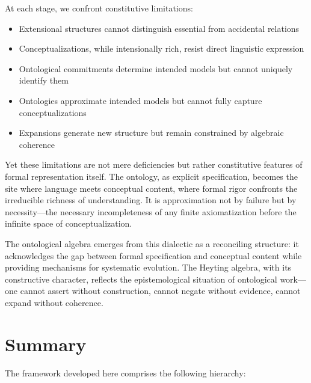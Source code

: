 \documentclass[11pt,a4paper]{article}
\newcommand{\domain}{\mathcal{D}}
\newcommand{\interp}{\mathcal{I}}
\newcommand{\concept}{\mathcal{C}}
\newcommand{\onto}{\mathcal{O}}
\newcommand{\intrel}{\mathfrak{R}}
\newcommand{\sem}[1]{\llbracket #1 \rrbracket}
\begin{document}
At each stage, we confront constitutive limitations:
\begin{itemize}
    \item Extensional structures cannot distinguish essential from accidental relations
    \item Conceptualizations, while intensionally rich, resist direct linguistic expression
    \item Ontological commitments determine intended models but cannot uniquely identify them
    \item Ontologies approximate intended models but cannot fully capture conceptualizations
    \item Expansions generate new structure but remain constrained by algebraic coherence
\end{itemize}

Yet these limitations are not mere deficiencies but rather constitutive features of formal representation itself. The ontology, as explicit specification, becomes the site where language meets conceptual content, where formal rigor confronts the irreducible richness of understanding. It is approximation not by failure but by necessity---the necessary incompleteness of any finite axiomatization before the infinite space of conceptualization.

The ontological algebra emerges from this dialectic as a reconciling structure: it acknowledges the gap between formal specification and conceptual content while providing mechanisms for systematic evolution. The Heyting algebra, with its constructive character, reflects the epistemological situation of ontological work---one cannot assert without construction, cannot negate without evidence, cannot expand without coherence.

\section{Summary}

The framework developed here comprises the following hierarchy:

\begin{center}
\end{center}
\end{document}
